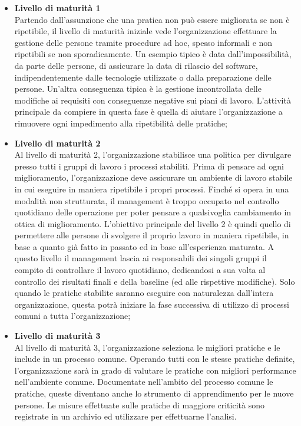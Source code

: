 \begin{itemize}
\item \textbf{Livello di maturità 1}\\
Partendo dall'assunzione che una pratica non può essere migliorata se non è ripetibile, il livello di maturità iniziale vede l'organizzazione effettuare la gestione delle persone tramite procedure ad hoc, spesso informali e non ripetibili se non sporadicamente. Un esempio tipico è data dall'impossibilità, da parte delle persone, di assicurare la data di rilascio del software, indipendentemente dalle tecnologie utilizzate o dalla preparazione delle persone. Un'altra conseguenza tipica è la gestione incontrollata delle modifiche ai requisiti con conseguenze negative sui piani di lavoro.
L'attività principale da compiere in questa fase è quella di aiutare l'organizzazione a rimuovere ogni impedimento alla ripetibilit\`a delle pratiche;
\item \textbf{Livello di maturità 2}\\
Al livello di maturità 2, l'organizzazione stabilisce una politica per divulgare presso tutti i gruppi di lavoro i processi stabiliti. Prima di pensare ad ogni miglioramento, l'organizzazione deve assicurare un ambiente di lavoro stabile in cui eseguire in maniera ripetibile i propri processi. Finché si opera in una modalità non strutturata, il management è troppo occupato nel controllo quotidiano delle operazione per poter pensare a qualsivoglia cambiamento in ottica di miglioramento. L'obiettivo principale del livello 2 è quindi quello di permettere alle persone di svolgere il proprio lavoro in maniera ripetibile, in base a quanto già fatto in passato ed in base all'esperienza maturata. A questo livello il management lascia ai responsabili dei singoli gruppi il compito di controllare il lavoro quotidiano, dedicandosi a sua volta al controllo dei risultati finali e della baseline (ed alle rispettive modifiche).
Solo quando le pratiche stabilite saranno eseguire con naturalezza dall'intera organizzazione, questa potrà iniziare la fase successiva di utilizzo di processi comuni a tutta l'organizzazione;
\item \textbf{Livello di maturità 3}\\
Al livello di maturità 3, l'organizzazione seleziona le migliori pratiche e le include in un processo comune. Operando tutti con le stesse pratiche definite, l'organizzazione sarà in grado di valutare le pratiche con migliori performance nell'ambiente comune. Documentate nell'ambito del processo comune le pratiche, queste diventano anche lo strumento di apprendimento per le nuove persone. Le misure effettuate sulle pratiche di maggiore criticità sono registrate in un archivio ed utilizzare per effettuarne l'analisi.

\end{itemize}
